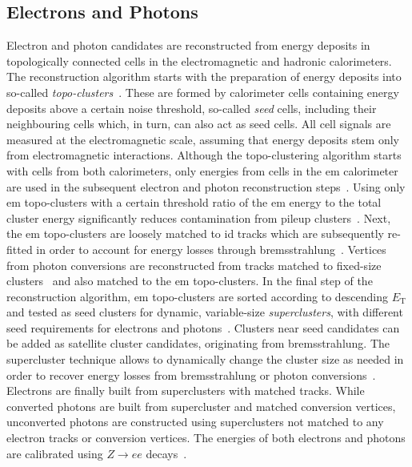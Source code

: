 \subsection{Electrons and Photons}\label{sec:reco_electrons}

Electron and photon candidates are reconstructed from energy deposits in topologically connected cells in the electromagnetic and hadronic calorimeters.
The reconstruction algorithm starts with the preparation of energy deposits into so-called \textit{topo-clusters}~\cite{PERF-2014-07}.
These are formed by calorimeter cells containing energy deposits above a certain noise threshold, so-called \textit{seed} cells, including their neighbouring cells which, in turn, can also act as seed cells.
All cell signals are measured at the electromagnetic scale, assuming that energy deposits stem only from electromagnetic interactions.
Although the topo-clustering algorithm starts with cells from both calorimeters, only energies from cells in the \gls{em} calorimeter are used in the subsequent electron and photon reconstruction steps~\cite{EGAM-2018-01}.
Using only \gls{em} topo-clusters with a certain threshold ratio of the \gls{em} energy to the total cluster energy significantly reduces contamination from pileup clusters~\cite{EGAM-2018-01}.
Next, the \gls{em} topo-clusters are loosely matched to \gls{id} tracks which are subsequently re-fitted in order to account for energy losses through bremsstrahlung~\cite{EGAM-2018-01}.
Vertices from photon conversions are reconstructed from tracks matched to fixed-size clusters~\cite{PERF-2017-02} and also matched to the \gls{em} topo-clusters.
In the final step of the reconstruction algorithm, \gls{em} topo-clusters are sorted according to descending $E_{\mathrm{T}}$ and tested as seed clusters for dynamic, variable-size \textit{superclusters}, with different seed requirements for electrons and photons~\cite{EGAM-2018-01}.
Clusters near seed candidates can be added as satellite cluster candidates, originating \eg from bremsstrahlung. The supercluster technique allows to dynamically change the cluster size as needed in order to recover energy losses from bremsstrahlung or photon conversions~\cite{EGAM-2018-01}.
Electrons are finally built from superclusters with matched tracks.
While converted photons are built from supercluster and matched conversion vertices, unconverted photons are constructed using superclusters not matched to any electron tracks or conversion vertices.
The energies of both electrons and photons are calibrated using $Z\rightarrow ee$ decays~\cite{EGAM-2018-01}.

